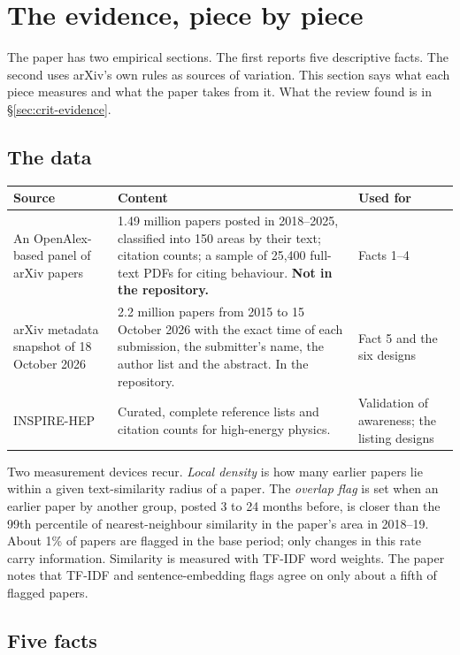 \section{The evidence, piece by piece}\label{sec:evidence}

The paper has two empirical sections. The first reports five descriptive facts. The second uses arXiv's own rules as sources of variation. This section says what each piece measures and what the paper takes from it. What the review found is in \S\ref{sec:crit-evidence}.

\subsection{The data}

\begin{center}\small
\begin{tabularx}{\textwidth}{@{}P{1.35in}LP{1.3in}@{}}
\toprule
Source & Content & Used for \\
\midrule
An OpenAlex-based panel of arXiv papers & 1.49 million papers posted in 2018--2025, classified into 150 areas by their text; citation counts; a sample of 25,400 full-text PDFs for citing behaviour. \textbf{Not in the repository.} & Facts 1--4 \\
arXiv metadata snapshot of 18 October 2026 & 2.2 million papers from 2015 to 15 October 2026 with the exact time of each submission, the submitter's name, the author list and the abstract. In the repository. & Fact 5 and the six designs \\
INSPIRE-HEP & Curated, complete reference lists and citation counts for high-energy physics. & Validation of awareness; the listing designs \\
\bottomrule
\end{tabularx}
\end{center}

Two measurement devices recur. \emph{Local density} is how many earlier papers lie within a given text-similarity radius of a paper. The \emph{overlap flag} is set when an earlier paper by another group, posted 3 to 24 months before, is closer than the 99th percentile of nearest-neighbour similarity in the paper's area in 2018--19. About 1\% of papers are flagged in the base period; only changes in this rate carry information. Similarity is measured with TF-IDF word weights. The paper notes that TF-IDF and sentence-embedding flags agree on only about a fifth of flagged papers.

\subsection{Five facts}

